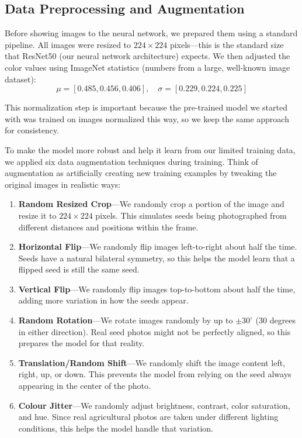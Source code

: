 \subsection{Data Preprocessing and Augmentation}
\label{subsec:augmentation}

Before showing images to the neural network, we prepared them using a standard pipeline. All images were resized to $224 \times 224$ pixels—this is the standard size that ResNet50 (our neural network architecture) expects. We then adjusted the color values using ImageNet statistics (numbers from a large, well-known image dataset):
\begin{equation}
\mu = [0.485, 0.456, 0.406], \quad \sigma = [0.229, 0.224, 0.225]
\end{equation}

This normalization step is important because the pre-trained model we started with was trained on images normalized this way, so we keep the same approach for consistency.

To make the model more robust and help it learn from our limited training data, we applied six data augmentation techniques during training. Think of augmentation as artificially creating new training examples by tweaking the original images in realistic ways:

\begin{enumerate}
    \item \textbf{Random Resized Crop}---We randomly crop a portion of the image and resize it to $224 \times 224$ pixels. This simulates seeds being photographed from different distances and positions within the frame.
    
    \item \textbf{Horizontal Flip}---We randomly flip images left-to-right about half the time. Seeds have a natural bilateral symmetry, so this helps the model learn that a flipped seed is still the same seed.
    
    \item \textbf{Vertical Flip}---We randomly flip images top-to-bottom about half the time, adding more variation in how the seeds appear.
    
    \item \textbf{Random Rotation}---We rotate images randomly by up to $\pm 30^{\circ}$ (30 degrees in either direction). Real seed photos might not be perfectly aligned, so this prepares the model for that reality.
    
    \item \textbf{Translation/Random Shift}---We randomly shift the image content left, right, up, or down. This prevents the model from relying on the seed always appearing in the center of the photo.
    
    \item \textbf{Colour Jitter}---We randomly adjust brightness, contrast, color saturation, and hue. Since real agricultural photos are taken under different lighting conditions, this helps the model handle that variation.
\end{enumerate}


